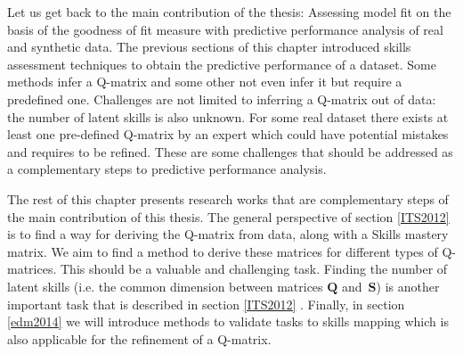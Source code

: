 Let us get back to the main contribution of the thesis:  Assessing model fit on the basis of the goodness of fit measure with predictive performance analysis of real and synthetic data. The previous sections of this chapter introduced skills assessment techniques to obtain the predictive performance of a dataset. Some methods infer a Q-matrix and some other not even infer it but require a predefined one. Challenges are not limited to inferring a Q-matrix out of data: the number of latent skills is also unknown. For some real dataset there exists at least one pre-defined Q-matrix  by an expert which could have potential mistakes and requires to be refined. These are some challenges that should be addressed as a complementary steps to predictive performance analysis.

The rest of this chapter presents research works that are complementary steps of the main contribution of this thesis. The general perspective of section \ref{ITS2012} is to find a way for deriving the Q-matrix from data, along with a Skills mastery matrix. We aim to find a method to derive these matrices for different types of Q-matrices. This should be a valuable and challenging task. Finding the number of latent skills (i.e. the common dimension between matrices $\mathbf{Q}$ and~$\mathbf{S}$) is another important task that is described in section \ref{ITS2012} . Finally, in section \ref{edm2014} we will introduce methods to validate tasks to skills mapping which is also applicable for the refinement of a Q-matrix.






